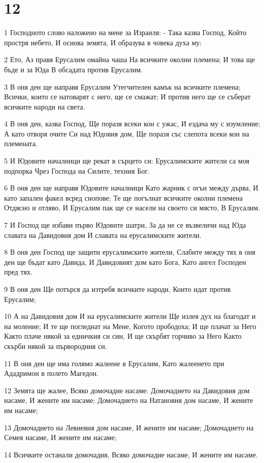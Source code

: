 \chapter{12}

\par 1 Господното слово наложено на мене за Израиля: - Така казва Господ, Който простря небето, И основа земята, И образува в човека духа му:
\par 2 Ето, Аз правя Ерусалим омайна чаша На всичките околни племена; И това ще бъде и за Юда В обсадата против Ерусалим.
\par 3 В оня ден ще направя Ерусалим Утегчителен камък на всичките племена; Всички, които се натоварят с него, ще се смажат; И против него ще се съберат всичките народи на света.
\par 4 В оня ден, казва Господ, Ще поразя всеки кон с ужас, И ездача му с изумление; А като отворя очите Си над Юдовия дом, Ще поразя със слепота всеки кон на племената.
\par 5 И Юдовите началници ще рекат в сърцето си: Ерусалимските жители са моя подпорка Чрез Господа на Силите, техния Бог.
\par 6 В оня ден ще направя Юдовите началници Като жарник с огън между дърва, И като запален факел всред снопове; Те ще погълнат всичките околни племена Отдясно и отляво, И Ерусалим пак ще се насели на своето си място, В Ерусалим.
\par 7 И Господ ще избави първо Юдовите шатри, За да не се възвеличи над Юда славата на Давидовия дом И славата на ерусалимските жители.
\par 8 В оня ден Господ ще защити ерусалимските жители, Слабите между тях в оня ден ще бъдат като Давида, И Давидовият дом като Бога, Като ангел Господен пред тях.
\par 9 В оня ден Ще потърся да изтребя всичките народи, Които идат против Ерусалим;
\par 10 А на Давидовия дом И на ерусалимските жители Ще излея дух на благодат и на моление; И те ще погледнат на Мене, Когото прободоха; И ще плачат за Него Както плаче някой за едничкия си син, И ще скърбят горчиво за Него Както скърби някой за първородния си.
\par 11 В оня ден ще има голямо жалеене в Ерусалим, Като жалеенето при Ададримон в полето Магедон.
\par 12 Земята ще жалее, Всяко домочадие насаме: Домочадието на Давидовия дом насаме, И жените им насаме; Домочадието на Натановия дом насаме, И жените им насаме;
\par 13 Домочадието на Левиевия дом насаме, И жените им насаме; Домочадието на Семея насаме, И жените им насаме;
\par 14 Всичките останали домочадия, Всяко домочадие насаме, И жените им насаме.

